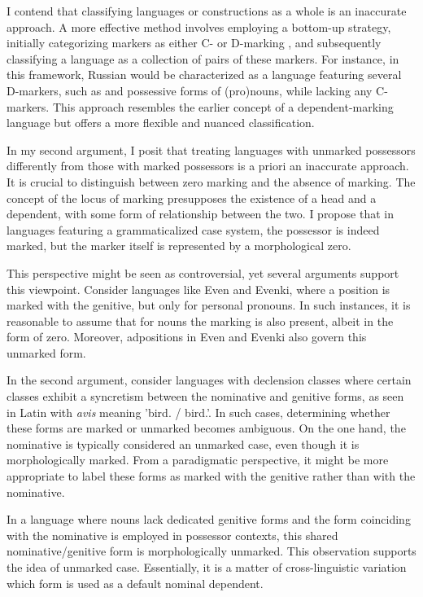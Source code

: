 I contend that classifying languages or constructions as a whole is an inaccurate approach. A more effective method involves employing a bottom-up strategy, initially categorizing markers as either C- or D-marking \citep{lander2020head}, and subsequently classifying a language as a collection of pairs of these markers. For instance, in this framework, Russian would be characterized as a language featuring several D-markers, such as \Gen{} and possessive forms of (pro)nouns, while lacking any C-markers. This approach resembles the earlier concept of a dependent-marking language but offers a more flexible and nuanced classification.

In my second argument, I posit that treating languages with unmarked possessors differently from those with marked possessors is a priori an inaccurate approach. It is crucial to distinguish between zero marking and the absence of marking. The concept of the locus of marking presupposes the existence of a head and a dependent, with some form of relationship between the two. I propose that in languages featuring a grammaticalized case system, the possessor is indeed marked, but the marker itself is represented by a morphological zero.

This perspective might be seen as controversial, yet several arguments support this viewpoint. Consider languages like Even and Evenki, where a position is marked with the genitive, but only for personal pronouns. In such instances, it is reasonable to assume that for nouns the marking is also present, albeit in the form of zero. Moreover, adpositions in Even and Evenki also govern this unmarked form.

In the second argument, consider languages with declension classes where certain classes exhibit a syncretism between the nominative and genitive forms, as seen in Latin with \textit{avis} meaning 'bird.\Nom{} / bird.\Gen{}'. In such cases, determining whether these forms are marked or unmarked becomes ambiguous. On the one hand, the nominative is typically considered an unmarked case, even though it is morphologically marked. From a paradigmatic perspective, it might be more appropriate to label these forms as marked with the genitive rather than with the nominative.

In a language where nouns lack dedicated genitive forms and the form coinciding with the nominative is employed in possessor contexts, this shared nominative/genitive form is morphologically unmarked. This observation supports the idea of unmarked case. Essentially, it is a matter of cross-linguistic variation which form is used as a default nominal dependent.

